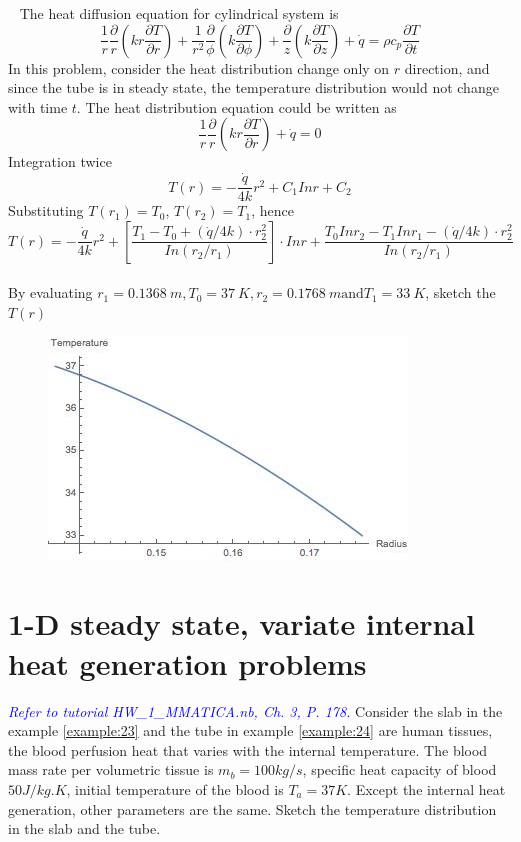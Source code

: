 \begin{solution}
~
The heat diffusion equation for cylindrical system is 
$$ 
\frac{1}{r}\frac{\partial}{r}(kr\frac{\partial T}{\partial r})+
\frac{1}{r^2}\frac{\partial}{\phi}(k\frac{\partial T}{\partial \phi})+
\frac{\partial}{z}(k\frac{\partial T}{\partial z})+
\dot{q} =
\rho c_p\frac{\partial T}{\partial t}
$$
In this problem, consider the heat distribution change only on $r$ direction,
and since the tube is in steady state, the temperature distribution would not
change with time $t$. The heat distribution equation could be written as
$$\frac{1}{r}\frac{\partial}{r}(kr\frac{\partial T}{\partial r})+\dot{q}=0$$
Integration twice
$$T(r)=-\frac{\dot{q}}{4k}r^2+C_1Inr+C_2$$
Substituting $T(r_1)=T_0$, $T(r_2)=T_1$, hence
$$
T(r)=-\frac{\dot{q}}{4k}r^2 +\left[\frac{T_1-T_0+(\dot{q}/4k)\cdot r_2^2}{In(r_2/r_1)} \right]\cdot Inr +
\frac{T_0Inr_2-T_1Inr_1-(\dot{q}/4k)\cdot r_2^2}{In(r_2/r_1)}
$$
~\\
By evaluating $r_1=0.1368~m, T_0=37~K, r_2=0.1768~m \text{and} T_1=33~K$,
sketch the $T(r)$
\begin{figure}[h!]
  \centering
    \includegraphics[scale=0.6]{figures/ch2/9}
\end{figure}
\end{solution}

\section{1-D steady state, variate internal	heat generation	problems}
\begin{example}
\textcolor{blue} {\emph{Refer to tutorial HW\_1\_MMATICA.nb, Ch. 3, P. 178.}}
Consider the slab in the example \ref{example:23} and the tube in example
\ref{example:24} are human tissues, the blood perfusion heat that varies with the internal temperature. The blood mass rate per volumetric tissue is $m_b=100kg/s$, specific heat capacity of blood $50J/kg.K$, initial temperature of the blood is 
$T_a=37K$. Except the internal heat generation, other parameters are the same. 
Sketch the temperature distribution in the slab and the tube.
\end{example}


